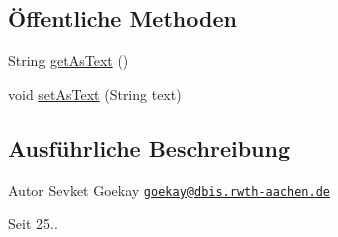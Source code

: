 \subsection*{Öffentliche Methoden}
\begin{DoxyCompactItemize}
\item 
String \hyperlink{classde_1_1rwth_1_1idsg_1_1steve_1_1web_1_1_local_date_editor_a93ce6a786d7d0c1429e19104cdaa0085}{get\-As\-Text} ()
\item 
void \hyperlink{classde_1_1rwth_1_1idsg_1_1steve_1_1web_1_1_local_date_editor_a4b7566f0410fd4744366121591580112}{set\-As\-Text} (String text)
\end{DoxyCompactItemize}


\subsection{Ausführliche Beschreibung}
\begin{DoxyAuthor}{Autor}
Sevket Goekay \href{mailto:goekay@dbis.rwth-aachen.de}{\tt goekay@dbis.\-rwth-\/aachen.\-de} 
\end{DoxyAuthor}
\begin{DoxySince}{Seit}
25.. 
\end{DoxySince}



